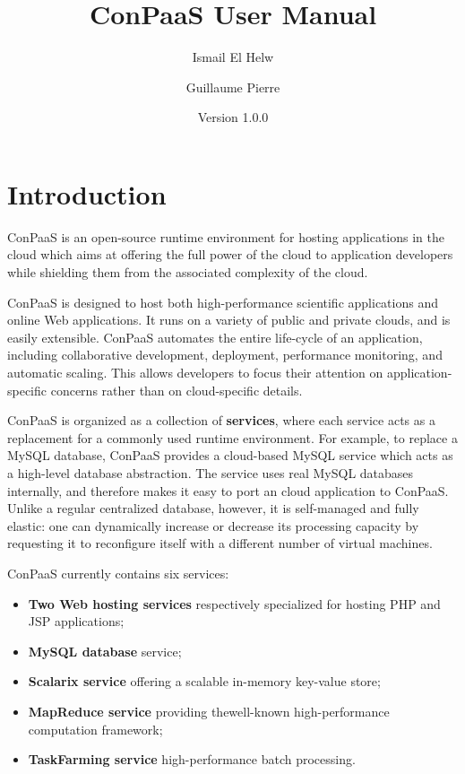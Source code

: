 \documentclass[10pt]{article}
\begin{document}
\title{ConPaaS User Manual}
\author{Ismail El Helw \and Guillaume Pierre}
\date{Version 1.0.0}
\maketitle

\vfil
\tableofcontents
\newpage

\section{Introduction}

ConPaaS is an open-source runtime environment for hosting applications
in the cloud which aims at offering the full power of the cloud to
application developers while shielding them from the associated
complexity of the cloud.

ConPaaS is designed to host both high-performance scientific
applications and online Web applications. It runs on a variety of
public and private clouds, and is easily extensible.  ConPaaS
automates the entire life-cycle of an application, including
collaborative development, deployment, performance monitoring, and
automatic scaling. This allows developers to focus their attention on
application-specific concerns rather than on cloud-specific details.

ConPaaS is organized as a collection of \textbf{services}, where each
service acts as a replacement for a commonly used runtime environment.
For example, to replace a MySQL database, ConPaaS provides a
cloud-based MySQL service which acts as a high-level database
abstraction. The service uses real MySQL databases internally, and
therefore makes it easy to port an cloud application to ConPaaS.
Unlike a regular centralized database, however, it is self-managed and
fully elastic: one can dynamically increase or decrease its processing
capacity by requesting it to reconfigure itself with a different
number of virtual machines.

ConPaaS currently contains six services: 

\begin{itemize}
\item \textbf{Two Web hosting services} respectively specialized for
  hosting PHP and JSP applications;
\item \textbf{MySQL database} service;
\item \textbf{Scalarix service} offering a scalable in-memory
  key-value store;
\item \textbf{MapReduce service} providing thewell-known
  high-performance computation framework;
\item \textbf{TaskFarming service} high-performance batch processing.
\end{itemize}
\end{document}
